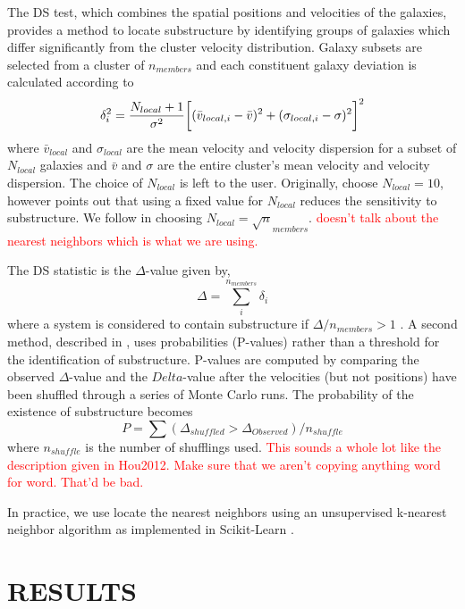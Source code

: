 \documentclass[apj, revtex4]{emulateapj}
\newcommand{\editorial}[1]{\textcolor{red}{#1} }
\begin{document}
The DS test, which combines the spatial positions and velocities of the galaxies, provides a method to locate substructure by identifying groups of galaxies which differ significantly from the cluster velocity distribution. Galaxy subsets are selected from a cluster of $n_{members}$ and each constituent galaxy deviation is calculated according to
\begin{equation}
	\delta_i^2 = \frac{N_{local}+1}{\sigma^2}\bigg{[}(\bar{v}_{local,i} - \bar{v})^2 + (\sigma_{local,i} - \sigma)^2\bigg{]}^2
\end{equation}
where $\bar{v}_{local}$ and $\sigma_{local}$ are the mean velocity and velocity dispersion for a subset of $N_{local}$ galaxies and $\bar{v}$ and $\sigma$ are the entire cluster's mean velocity and velocity dispersion. The choice of $N_{local}$ is left to the user. Originally, \cite{Dressler1988} choose $N_{local}=10$, however \cite{Bird1994} points out that using a fixed value for $N_{local}$ reduces the sensitivity to substructure. We follow \cite{Bird1994} in choosing $N_{local} = \sqrt n_{members}$. \editorial{doesn't talk about the nearest neighbors which is what we are using.}

The DS statistic is the $\Delta$-value given by, 
\begin{equation}
	\Delta = \sum^{n_{members}}_i \delta_i
\end{equation}
where a system is considered to contain substructure if $\Delta/n_{members} > 1$ \citep{Dressler1988}. A second method, described in \cite{Hou2012}, uses probabilities (P-values) rather than a threshold for the identification of substructure. P-values are computed by comparing the observed $\Delta$-value and the $Delta$-value after the velocities (but not positions) have been shuffled through a series of Monte Carlo runs. The probability of the existence of substructure becomes
\begin{equation}
	P = \sum (\Delta_{shuffled} > \Delta_{Observed}) / n_{shuffle}
\end{equation}
where $n_{shuffle}$ is the number of shufflings used. \editorial{This sounds a whole lot like the description given in Hou2012. Make sure that we aren't copying anything word for word. That'd be bad.}

In practice, we use locate the nearest neighbors using an unsupervised k-nearest neighbor algorithm as implemented in Scikit-Learn \citep{Pedregosa2012}. 

\section{RESULTS}
\end{document}
